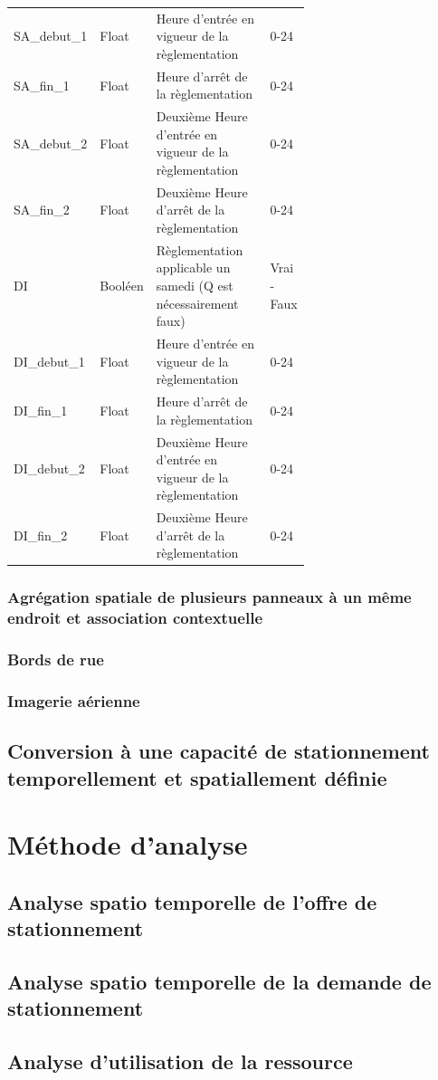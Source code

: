 \begin{longtable}{p{0.15 \linewidth}  l p{0.5\linewidth} l  }
          SA\_debut\_1 & Float & Heure d'entrée en vigueur de la règlementation & 0-24\\
          SA\_fin\_1 & Float & Heure d'arrêt de la règlementation & 0-24\\
          SA\_debut\_2 & Float & Deuxième Heure d'entrée en vigueur de la règlementation & 0-24\\
          SA\_fin\_2 & Float & Deuxième Heure d'arrêt de la règlementation & 0-24 \\
          DI & Booléen & Règlementation applicable un samedi (Q est nécessairement faux) & Vrai - Faux \\
          DI\_debut\_1 & Float & Heure d'entrée en vigueur de la règlementation & 0-24\\
          DI\_fin\_1 & Float & Heure d'arrêt de la règlementation & 0-24\\
          DI\_debut\_2 & Float & Deuxième Heure d'entrée en vigueur de la règlementation & 0-24\\
          DI\_fin\_2 & Float & Deuxième Heure d'arrêt de la règlementation & 0-24 \\  
        \end{longtable}

      \FloatBarrier
      \subsubsection{Agrégation spatiale de plusieurs panneaux à un même endroit et association contextuelle}
    \subsubsection{Bords de rue}
    \subsubsection{Imagerie aérienne}
  \subsection{Conversion à une capacité de stationnement temporellement et spatiallement définie}
\section{Méthode d'analyse}
  \subsection{Analyse spatio temporelle de l'offre de stationnement}
  \subsection{Analyse spatio temporelle de la demande de stationnement}
  \subsection{Analyse d'utilisation de la ressource}
